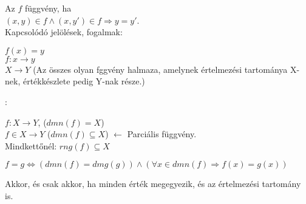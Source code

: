 \begin{frame}
\begin{tcolorbox}[title={Def.: Függvény, Parciális függvény}]
Az $f$  függvény, ha\\
$(x, y) \in f \land (x, y') \in f \Rightarrow y = y'$.\\
\tcblower
Kapcsolódó jelölések, fogalmak:\\
\mmedskip

$f(x) = y$\\
$f : x \rightarrow y$\\
$X \rightarrow Y$ (Az összes olyan fggvény halmaza, amelynek értelmezési tartománya X-nek, értékkészlete pedig Y-nak része.)\\
\mmedskip

:\\
\msmallskip

$f: X \rightarrow Y$, ($dmn(f) = X$)\\
$f \in X \rightarrow Y$ ($dmn(f) \subseteq X$) $\leftarrow$ Parciális függvény.\\
Mindkettőnél: $rng(f) \subseteq X$
\end{tcolorbox}

\begin{tcolorbox}[title={Mikor egyenlő két függvény?}]
$f = g \iff (dmn(f) = dmg(g)) \land ({\forall}x \in dmn(f) \Rightarrow f(x) = g(x))$\\
\mmedskip

Akkor, és csak akkor, ha minden érték megegyezik, és az értelmezési tartomány is.
\end{tcolorbox}
\end{frame}

